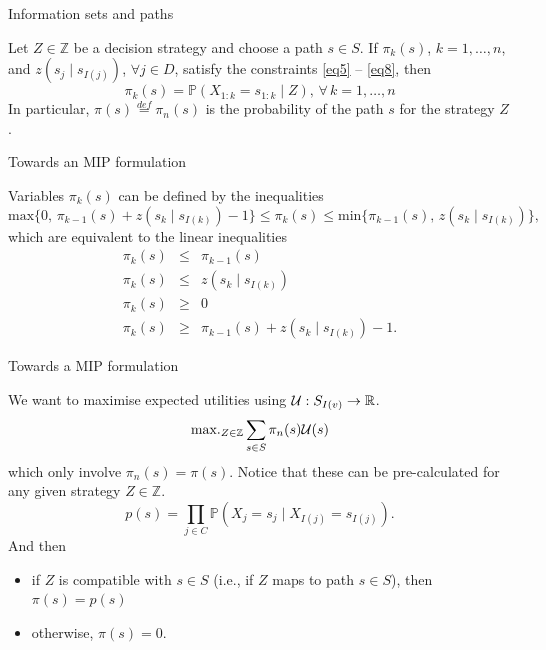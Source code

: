 \documentclass[mathserif,aspectratio=149]{beamer}
\begin{document}
\begin{frame}{Information sets and paths}

	\begin{theorem} \label{scenariopaths}
		Let $Z \in \mathbb{Z}$ be a decision strategy and choose a path $s \in S$. If $\pi_k(s)$, $k = 1, \dots, n$, and $z(s_j \mid s_{I(j)})$, $\forall j \in D$, satisfy the constraints \eqref{eq5} -- \eqref{eq8}, then 
		\begin{equation*} \label{pi_recursion}
			\pi_k(s) = \mathbb{P}(X_{1:k} = s_{1:k} \mid Z), \, \forall \, k = 1,\dots,n
		\end{equation*}
		In particular, $\pi(s) \overset{def}{=} \pi_n(s)$ is the probability of the path $s$ for the strategy $Z$.
	\end{theorem}

\end{frame}


\begin{frame}{Towards an MIP formulation}


	Variables $\pi_k(s)$ can be defined by the inequalities
	\begin{equation*}\label{decisionconstraints}
	\text{max} \{0, \, \pi_{k-1}(s) + z(s_k \mid s_{I(k)}\textbf{}) - 1\}  \leq \pi_k(s) \leq \text{min} \{ \pi_{k-1}(s),\, z(s_k \mid s_{I(k)}) \}, 
	\end{equation*}
	which are equivalent to the \alert{linear inequalities}
	\begin{eqnarray}
	\pi_k(s) & \leq & \pi_{k-1}(s) \label{inequality1} \\
	\pi_k(s) & \leq & z(s_k \mid s_{I(k)}) \label{inequality2} \\
	\pi_k(s) & \geq & 0 \label{inequality3} \\
	\pi_k(s) & \geq & \pi_{k-1}(s) + z(s_k \mid s_{I(k)}) - 1. \label{inequality4}
	\end{eqnarray}

\end{frame}


\begin{frame}{Towards a MIP formulation}

	We want to maximise expected utilities using ${\cal U}:S_{I(v)} \to \mathbb{R}$.
	\begin{equation*}
	\text{max.}_{Z \in \mathbb{Z}} \sum_{s \in S} \pi_n(s) {\cal U}(s)
	\end{equation*}
	which only involve $\pi_n(s) = \pi(s)$. \pause Notice that these can be \alert{pre-calculated for any given strategy $Z \in \mathbb{Z}$.}
	\begin{equation*}
	p(s) = \prod_{j \in C} \mathbb{P}(X_j = s_j \mid X_{I(j)} = s_{I(j)}).
	\end{equation*}
	And then 
	\vspace{-6pt}
	\begin{itemize}
	\item if $Z$ is \alert{compatible} with $s \in S$ (i.e., if $Z$ maps to path $s \in S$), then $\pi(s) = p(s)$
	\item otherwise, $\pi(s) = 0$.
	\end{itemize}

\end{frame}
\end{document}
